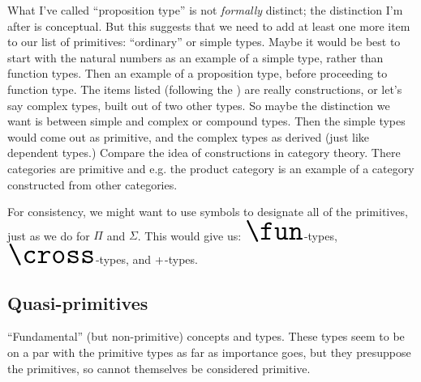 \begin{ednote}
  What I've called ``proposition type'' is not \textit{formally}
  distinct; the distinction I'm after is conceptual.  But this
  suggests that we need to add at least one more item to our list of
  primitives: ``ordinary'' or simple types.  Maybe it would be best to
  start with the natural numbers as an example of a simple type,
  rather than function types.  Then an example of a proposition type,
  before proceeding to function type.  The items listed (following the
  \HoTTB{}) are really constructions, or let's say complex types,
  built out of two other types.  So maybe the distinction we want is
  between simple and complex or compound types.  Then the simple types
  would come out as primitive, and the complex types as derived (just
  like dependent types.)  Compare the idea of constructions in
  category theory.  There categories are primitive and e.g. the
  product category is an example of a category constructed from other
  categories.
\end{ednote}

\begin{ednote}
  For consistency, we might want to use symbols to designate all of
  the primitives, just as we do for \(\Pi\) and \(\Sigma\).  This
  would give us: \(\Huge\fun\)-types, \(\Huge\cross\)-types, and
  \(\Huge +\)-types.
\end{ednote}


\subsection{\HoTT{} Quasi-primitives}
\label{subs:quasiprim}

\noindent ``Fundamental''%
(but non-primitive) concepts and types.  These types seem to be on a par
with the primitive types as far as importance goes, but they
presuppose the primitives, so cannot themselves be considered
primitive.

